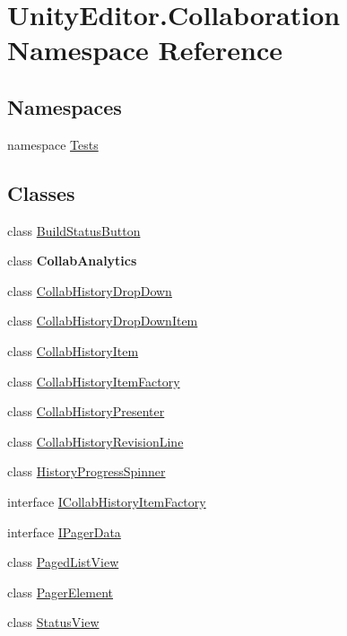 \hypertarget{namespace_unity_editor_1_1_collaboration}{}\section{Unity\+Editor.\+Collaboration Namespace Reference}
\label{namespace_unity_editor_1_1_collaboration}
\subsection*{Namespaces}
\begin{DoxyCompactItemize}
\item 
namespace \mbox{\hyperlink{namespace_unity_editor_1_1_collaboration_1_1_tests}{Tests}}
\end{DoxyCompactItemize}
\subsection*{Classes}
\begin{DoxyCompactItemize}
\item 
class \mbox{\hyperlink{class_unity_editor_1_1_collaboration_1_1_build_status_button}{Build\+Status\+Button}}
\item 
class {\bfseries Collab\+Analytics}
\item 
class \mbox{\hyperlink{class_unity_editor_1_1_collaboration_1_1_collab_history_drop_down}{Collab\+History\+Drop\+Down}}
\item 
class \mbox{\hyperlink{class_unity_editor_1_1_collaboration_1_1_collab_history_drop_down_item}{Collab\+History\+Drop\+Down\+Item}}
\item 
class \mbox{\hyperlink{class_unity_editor_1_1_collaboration_1_1_collab_history_item}{Collab\+History\+Item}}
\item 
class \mbox{\hyperlink{class_unity_editor_1_1_collaboration_1_1_collab_history_item_factory}{Collab\+History\+Item\+Factory}}
\item 
class \mbox{\hyperlink{class_unity_editor_1_1_collaboration_1_1_collab_history_presenter}{Collab\+History\+Presenter}}
\item 
class \mbox{\hyperlink{class_unity_editor_1_1_collaboration_1_1_collab_history_revision_line}{Collab\+History\+Revision\+Line}}
\item 
class \mbox{\hyperlink{class_unity_editor_1_1_collaboration_1_1_history_progress_spinner}{History\+Progress\+Spinner}}
\item 
interface \mbox{\hyperlink{interface_unity_editor_1_1_collaboration_1_1_i_collab_history_item_factory}{I\+Collab\+History\+Item\+Factory}}
\item 
interface \mbox{\hyperlink{interface_unity_editor_1_1_collaboration_1_1_i_pager_data}{I\+Pager\+Data}}
\item 
class \mbox{\hyperlink{class_unity_editor_1_1_collaboration_1_1_paged_list_view}{Paged\+List\+View}}
\item 
class \mbox{\hyperlink{class_unity_editor_1_1_collaboration_1_1_pager_element}{Pager\+Element}}
\item 
class \mbox{\hyperlink{class_unity_editor_1_1_collaboration_1_1_status_view}{Status\+View}}
\end{DoxyCompactItemize}
